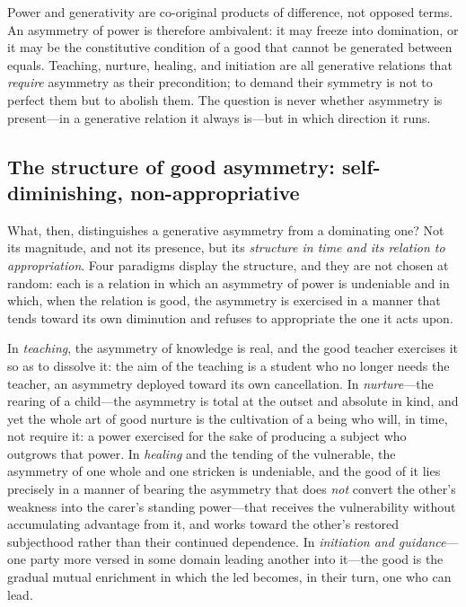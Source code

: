 \begin{claim}
Power and generativity are co-original products of difference, not opposed terms. An asymmetry of power is therefore ambivalent: it may freeze into domination, or it may be the constitutive condition of a good that cannot be generated between equals. Teaching, nurture, healing, and initiation are all generative relations that \emph{require} asymmetry as their precondition; to demand their symmetry is not to perfect them but to abolish them. The question is never whether asymmetry is present---in a generative relation it always is---but in which direction it runs.
\end{claim}

\subsection{The structure of good asymmetry: self-diminishing, non-appropriative}
\label{p17:sub:asymmetry-structure}

What, then, distinguishes a generative asymmetry from a dominating one? Not its magnitude, and not its presence, but its \emph{structure in time and its relation to appropriation}. Four paradigms display the structure, and they are not chosen at random: each is a relation in which an asymmetry of power is undeniable and in which, when the relation is good, the asymmetry is exercised in a manner that tends toward its own diminution and refuses to appropriate the one it acts upon.

In \emph{teaching}, the asymmetry of knowledge is real, and the good teacher exercises it so as to dissolve it: the aim of the teaching is a student who no longer needs the teacher, an asymmetry deployed toward its own cancellation. In \emph{nurture}---the rearing of a child---the asymmetry is total at the outset and absolute in kind, and yet the whole art of good nurture is the cultivation of a being who will, in time, not require it: a power exercised for the sake of producing a subject who outgrows that power. In \emph{healing} and the tending of the vulnerable, the asymmetry of one whole and one stricken is undeniable, and the good of it lies precisely in a manner of bearing the asymmetry that does \emph{not} convert the other's weakness into the carer's standing power---that receives the vulnerability without accumulating advantage from it, and works toward the other's restored subjecthood rather than their continued dependence. In \emph{initiation and guidance}---one party more versed in some domain leading another into it---the good is the gradual mutual enrichment in which the led becomes, in their turn, one who can lead.

